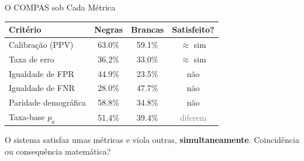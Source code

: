 \documentclass[aspectratio=169,xcolor=dvipsnames]{beamer}
\begin{document}
  \begin{frame}{O COMPAS sob Cada Métrica}
    \centering
    \renewcommand{\arraystretch}{1.3}
    \begin{tabular}{lccc}
      \toprule
      \textbf{Critério} & \textbf{Negras} & \textbf{Brancas} & \textbf{Satisfeito?} \\
      \midrule
      Calibração (PPV) & 63.0\% & 59.1\% & \textcolor{FairGreen}{$\approx$ sim} \\
      Taxa de erro & 36.2\% & 33.0\% & \textcolor{FairGreen}{$\approx$ sim} \\
      Igualdade de FPR & 44.9\% & 23.5\% & \textcolor{FairRed}{não} \\
      Igualdade de FNR & 28.0\% & 47.7\% & \textcolor{FairRed}{não} \\
      Paridade demográfica & 58.8\% & 34.8\% & \textcolor{FairRed}{não} \\
      \midrule
      Taxa-base $p_a$ & 51.4\% & 39.4\% & \textcolor{gray}{diferem} \\
      \bottomrule
    \end{tabular}

    \vspace{0.6em}
    O sistema satisfaz umas métricas e viola outras, \textbf{simultaneamente}. Coincidência ou consequência matemática?
  \end{frame}
\end{document}
